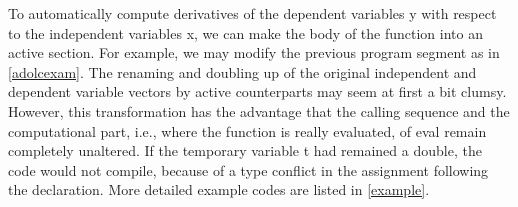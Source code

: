 \documentclass[11pt,twoside]{article}
\begin{document}
To automatically compute derivatives of the dependent 
variables {\sf y} with respect to the independent variables {\sf x}, we
can make the body of the function into an active section. For
example, we may modify the previous program segment 
as in \autoref{adolcexam}.
The renaming and doubling up of the original independent and dependent
variable vectors by active counterparts may seem at first a bit clumsy.
However, this transformation has the advantage that the calling
sequence and the computational part, i.e., where the function is
really evaluated, of {\sf eval} remain completely
unaltered. If the temporary variable {\sf t} had remained a {\sf double},
the code would not compile, because of a type conflict in the assignment
following the declaration. More detailed example codes are listed in 
\autoref{example}.
\end{document}
